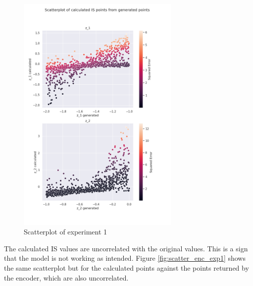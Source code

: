 \begin{figure}[H]
    \centering
    \includegraphics[width=0.7\textwidth]{Cap5/scatterplot1}
    \caption{Scatterplot of experiment 1}
    \label{fig:scatter_exp1}
\end{figure}

The calculated IS values are uncorrelated with the original values. This is a sign that the model is not working as intended. Figure \ref{fig:scatter_enc_exp1} shows the same scatterplot but for the calculated points against the points returned by the encoder, which are also uncorrelated.

